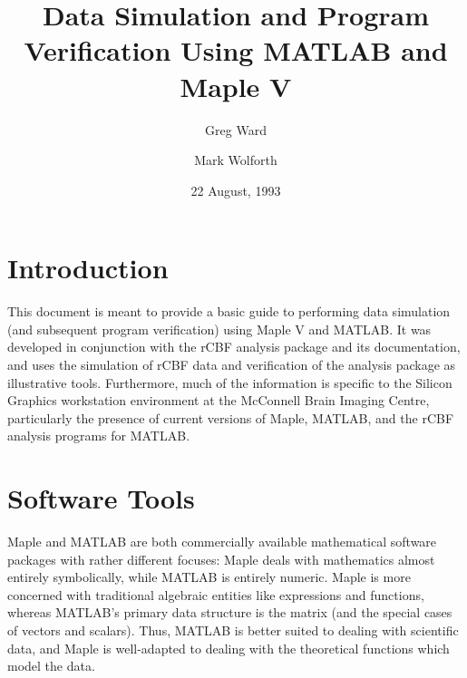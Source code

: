 
\title{Data Simulation and Program Verification Using MATLAB and Maple V}
\author{Greg Ward \and Mark Wolforth}
\date{22 August, 1993}

\def\code#1{{\tt #1}}

\def\simuldir{~greg/matlab/testing}
\newcommand{\units}[1]{\mbox{$\rm{#1}$}}
\newcommand{\funits}[2]{\mbox{$\rm\frac{#1}{#2}$}}



\maketitle

\tableofcontents

\section{Introduction}

This document is meant to provide a basic guide to performing data
simulation (and subsequent program verification) using Maple V and
MATLAB.  It was developed in conjunction with the rCBF analysis
package and its documentation, and uses the simulation of rCBF data
and verification of the analysis package as illustrative tools.
Furthermore, much of the information is specific to the Silicon
Graphics workstation environment at the McConnell Brain Imaging
Centre, particularly the presence of current versions of Maple,
MATLAB, and the rCBF analysis programs for MATLAB.

\section{Software Tools}

Maple and MATLAB are both commercially available mathematical software
packages with rather different focuses: Maple deals with mathematics
almost entirely symbolically, while MATLAB is entirely numeric.  Maple
is more concerned with traditional algebraic entities like expressions
and functions, whereas MATLAB's primary data structure is the matrix
(and the special cases of vectors and scalars).  Thus, MATLAB is
better suited to dealing with scientific data, and Maple is
well-adapted to dealing with the theoretical functions which model the
data.


